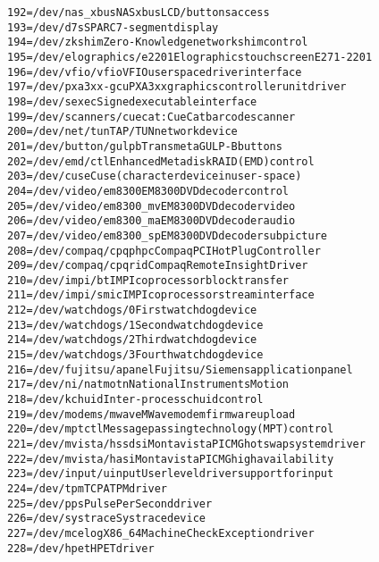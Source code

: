 \documentclass[a4paper,8pt,english]{sphinxmanual}
\begin{document}
\begin{alltt}
                192 = /dev/nas\_xbus     NAS xbus LCD/buttons access
                193 = /dev/d7s          SPARC 7-segment display
                194 = /dev/zkshim       Zero-Knowledge network shim control
                195 = /dev/elographics/e2201    Elographics touchscreen E271-2201
                196 = /dev/vfio/vfio    VFIO userspace driver interface
                197 = /dev/pxa3xx-gcu   PXA3xx graphics controller unit driver
                198 = /dev/sexec        Signed executable interface
                199 = /dev/scanners/cuecat :CueCat barcode scanner
                200 = /dev/net/tun      TAP/TUN network device
                201 = /dev/button/gulpb Transmeta GULP-B buttons
                202 = /dev/emd/ctl      Enhanced Metadisk RAID (EMD) control
                203 = /dev/cuse         Cuse (character device in user-space)
                204 = /dev/video/em8300         EM8300 DVD decoder control
                205 = /dev/video/em8300\_mv      EM8300 DVD decoder video
                206 = /dev/video/em8300\_ma      EM8300 DVD decoder audio
                207 = /dev/video/em8300\_sp      EM8300 DVD decoder subpicture
                208 = /dev/compaq/cpqphpc       Compaq PCI Hot Plug Controller
                209 = /dev/compaq/cpqrid        Compaq Remote Insight Driver
                210 = /dev/impi/bt      IMPI coprocessor block transfer
                211 = /dev/impi/smic    IMPI coprocessor stream interface
                212 = /dev/watchdogs/0  First watchdog device
                213 = /dev/watchdogs/1  Second watchdog device
                214 = /dev/watchdogs/2  Third watchdog device
                215 = /dev/watchdogs/3  Fourth watchdog device
                216 = /dev/fujitsu/apanel       Fujitsu/Siemens application panel
                217 = /dev/ni/natmotn           National Instruments Motion
                218 = /dev/kchuid       Inter-process chuid control
                219 = /dev/modems/mwave MWave modem firmware upload
                220 = /dev/mptctl       Message passing technology (MPT) control
                221 = /dev/mvista/hssdsi        Montavista PICMG hot swap system driver
                222 = /dev/mvista/hasi          Montavista PICMG high availability
                223 = /dev/input/uinput         User level driver support for input
                224 = /dev/tpm          TCPA TPM driver
                225 = /dev/pps          Pulse Per Second driver
                226 = /dev/systrace     Systrace device
                227 = /dev/mcelog       X86\_64 Machine Check Exception driver
                228 = /dev/hpet         HPET driver

\end{alltt}
\end{document}
